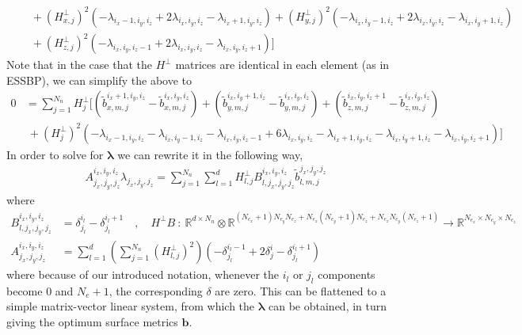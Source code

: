 \documentclass[12pt,a4paper]{article}
\begin{document}
{\begin{align*}
& \quad + \left( H^\bot_{x,j} \right)^2 \left(
 -  \lambda_{i_x-1,i_y,i_z} + 2 \lambda_{i_x,i_y,i_z}  -  \lambda_{i_x+1,i_y,i_z}  \right)  + \left( H^\bot_{y,j} \right)^2 \left(
 -  \lambda_{i_x,i_y-1,i_z} + 2 \lambda_{i_x,i_y,i_z}  -  \lambda_{i_x,i_y+1,i_z}  \right) \\
 & \quad + \left( H^\bot_{z,j} \right)^2 \left(
 -  \lambda_{i_x,i_y,i_z-1} + 2 \lambda_{i_x,i_y,i_z}  -  \lambda_{i_x,i_y,i_z+1}  \right) \Big]
\end{align*}
Note that in the case that the $H^\bot$ matrices are identical in each element (as in ESSBP), we can simplify the above to
\begin{align*}
0 &=  \sum_{j=1}^{N_n} H^\bot_{j} \Big[  \left( \tilde{b}_{x,m,j}^{i_x+1,i_y,i_z} - \tilde{b}_{x,m,j}^{i_x,i_y,i_z} \right) + \left( \tilde{b}_{y,m,j}^{i_x,i_y+1,i_z} - \tilde{b}_{y,m,j}^{i_x,i_y,i_z} \right) + \left( \tilde{b}_{z,m,j}^{i_x,i_y,i_z+1} - \tilde{b}_{z,m,j}^{i_x,i_y,i_z} \right) \\
& \ + \left( H^\bot_{j}  \right)^2 \left( - \lambda_{i_x-1,i_y,i_z}  - \lambda_{i_x,i_y-1,i_z} - \lambda_{i_x,i_y,i_z-1} + 6 \lambda_{i_x,i_y,i_z} -  \lambda_{i_x+1,i_y,i_z} - \lambda_{i_x,i_y+1,i_z} - \lambda_{i_x,i_y,i_z+1} \right) \Big]
\end{align*}
In order to solve for $\bm{\lambda}$ we can rewrite it in the following way,
\begin{align*}
A^{i_x,i_y,i_z}_{j_x,j_y,j_z} \lambda_{j_x,j_y,j_z} =  \sum_{j=1}^{N_n} \sum_{l=1}^d H^\bot_{l,j} B^{i_x,i_y,i_z}_{l,j_x,j_y,j_z} \tilde{b}_{l,m,j}^{j_x,j_y,j_z}
\end{align*}
where
\begin{align*}
B^{i_x,i_y,i_z}_{l,j_x,j_y,j_z} &= \delta^{i_l}_{j_l} - \delta^{i_l+1}_{j_l} \quad , \quad 
H^\bot B \ : \ \mathds{R}^{d \times N_n} \otimes \mathds{R}^{(N_{e_x} + 1)N_{e_y} N_{e_z} + N_{e_x} (N_{e_y}+1) N_{e_z} + N_{e_x} N_{e_y} (N_{e_z}+1)}  \rightarrow \mathds{R}^{N_{e_x} \times N_{e_y} \times N_{e_z}}  \\
A^{i_x,i_y,i_z}_{j_x,j_y,j_z} &= 
\sum_{l=1}^d \left( \sum_{j=1}^{N_n} \left( H^\bot_{l,j} \right)^2 \right) \left(
  -  \delta_{j_l}^{i_l-1} + 2 \delta_{j}^{i} - \delta_{j_l}^{i_l+1} \right)
\end{align*}
where because of our introduced notation, whenever the $i_l$ or $j_l$ components become $0$ and $N_e + 1$, the corresponding $\delta$ are zero. This can be flattened to a simple matrix-vector linear system, from which the $\bm{\lambda}$ can be obtained, in turn giving the optimum surface metrics $\bm{b}$.
}
\end{document}
